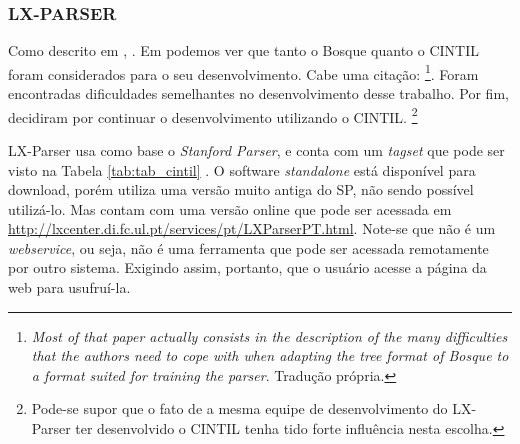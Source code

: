 \subsubsection{LX-PARSER}
\label{subsubsec:lxparser}
Como descrito em \cite{siteLxParser}, . Em \cite{Branco2010OutOfTheBox} podemos ver que tanto o Bosque quanto o CINTIL foram considerados para o seu desenvolvimento. Cabe uma citação: 
\footnote{\textit{Most of that paper actually consists in the description of the many difficulties that the authors need to cope with when adapting the tree format of Bosque to a format suited for training the parser}. Tradução própria.}.
Foram encontradas dificuldades semelhantes no desenvolvimento desse trabalho. Por fim, \citeauthor{Branco2010OutOfTheBox} decidiram por continuar o desenvolvimento utilizando o CINTIL.
\footnote{Pode-se supor que o fato de a mesma equipe de desenvolvimento do LX-Parser ter desenvolvido o CINTIL tenha tido forte influência nesta escolha.}

LX-Parser usa como base o \textit{Stanford Parser}, e conta com um \textit{tagset} que pode ser visto na Tabela \ref{tab:tab_cintil}
.
O software \textit{standalone} está disponível para download, porém utiliza uma versão muito antiga do SP, não sendo possível utilizá-lo. Mas contam com uma versão online que pode ser acessada em \url{http://lxcenter.di.fc.ul.pt/services/pt/LXParserPT.html}. Note-se que não é um \textit{webservice}, ou seja, não é uma ferramenta que pode ser acessada remotamente por outro sistema. Exigindo assim, portanto, que o usuário acesse a página da web para usufruí-la.